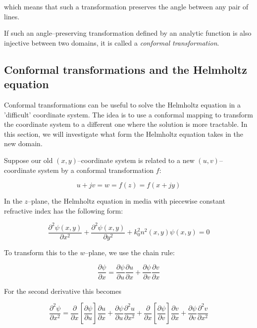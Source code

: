 which means that such a transformation preserves the angle between any pair of
lines.

If such an angle--preserving transformation defined by an analytic function is also injective between two domains, it is
called a \emph{conformal transformation}.

\subsection{Conformal transformations and the Helmholtz equation}

Conformal transformations can be useful to solve the Helmholtz equation in a
'difficult' coordinate system. The idea is to use a conformal mapping to
transform the coordinate system to a different one where the solution is more
tractable. In this section, we will investigate what form the Helmholtz equation
takes in the new domain.

Suppose our old $(x,y)$--coordinate system is related to a new
$(u,v)$--coordinate system by a conformal transformation $f$:

\begin{equation}
u+jv = w = f(z) = f(x+jy)
\end{equation} 

In the $z$--plane, the Helmholtz equation in media with piecewise constant
refractive index has the following form:

\begin{equation}
\frac{\partial^2 \psi(x,y)}{\partial x^2} + \frac{\partial^2 \psi(x,y)}{\partial
y^2} + k_0^2 n^2(x,y) \psi(x,y) = 0
\end{equation} 

To transform this to the $w$--plane, we use the chain rule:

\begin{equation}
\frac{\partial \psi}{\partial x} = \frac{\partial \psi}{\partial u}
\frac{\partial u}{\partial x} + \frac{\partial \psi}{\partial v} \frac{\partial
v}{\partial x}
\end{equation} 

For the second derivative this becomes

\begin{equation}
\frac{\partial^2 \psi}{\partial x^2} = \frac{\partial}{\partial x} \left[
\frac{\partial \psi}{\partial u}\right]  \frac{\partial u}{\partial x} +
\frac{\partial \psi}{\partial u}\frac{\partial^2 u}{\partial x^2} +  
\frac{\partial}{\partial x} \left[ \frac{\partial \psi}{\partial v}\right] 
\frac{\partial v}{\partial x}  + \frac{\partial \psi}{\partial
v}\frac{\partial^2 v}{\partial x^2}
\end{equation} 

